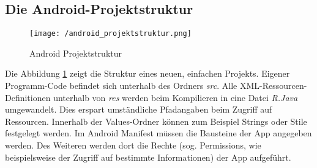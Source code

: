 \subsection{Die Android-Projektstruktur}

\begin{figure}[H]
\centering
\texttt{[image: /android\_projektstruktur.png]}
\caption{Android Projektstruktur}
\label{fig:android_projektstruktur}
\end{figure}

Die Abbildung \ref{fig:android_projektstruktur} zeigt die Struktur eines neuen, einfachen
Projekts. Eigener Programm-Code befindet sich unterhalb des Ordners \emph{src}.
Alle XML-Ressourcen-Definitionen unterhalb von \emph{res} werden beim Kompilieren in eine
Datei \emph{R.Java} umgewandelt. Dies erspart umständliche Pfadangaben beim Zugriff auf Ressourcen.
Innerhalb der Values-Ordner können zum Beispiel Strings oder Stile festgelegt werden.
Im Android Manifest müssen die Bausteine der App angegeben werden.
Des Weiteren werden dort die Rechte (sog. Permissions, wie beispielsweise der Zugriff
auf bestimmte Informationen) der App aufgeführt.




